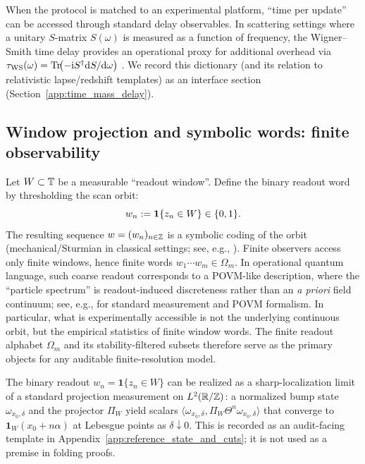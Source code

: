 \begin{remark}\label{rem:delay_time_dictionary}
When the protocol is matched to an experimental platform, ``time per update'' can be accessed through standard delay observables.
In scattering settings where a unitary $S$-matrix $S(\omega)$ is measured as a function of frequency, the Wigner--Smith time delay provides an operational proxy for additional overhead via $\tau_{\mathrm{WS}}(\omega)=\mathrm{Tr}\!\bigl(-\mathrm{i} S^\dagger \mathrm{d} S/\mathrm{d}\omega\bigr)$ \cite{Wigner1955,Smith1960}.
We record this dictionary (and its relation to relativistic lapse/redshift templates) as an interface section (Section~\ref{app:time_mass_delay}).
\end{remark}

\subsection{Window projection and symbolic words: finite observability}
\label{subsec:window_projection}

Let $W\subset\mathbb{T}$ be a measurable ``readout window''.
Define the binary readout word by thresholding the scan orbit:
\begin{equation}\label{eq:window_word}
w_n:=\mathbf{1}\{z_n\in W\}\in\{0,1\}.
\end{equation}
The resulting sequence $w=(w_n)_{n\in\mathbb{Z}}$ is a symbolic coding of the orbit (mechanical/Sturmian in classical settings; see, e.g., \cite{Lothaire2002,LindMarcus1995}).
Finite observers access only finite windows, hence finite words $w_1\cdots w_m\in\Omega_m$.
In operational quantum language, such coarse readout corresponds to a POVM-like description, where the ``particle spectrum'' is readout-induced discreteness rather than an \emph{a priori} field continuum; see, e.g., \cite{NielsenChuang2010} for standard measurement and POVM formalism.
In particular, what is experimentally accessible is not the underlying continuous orbit, but the empirical statistics of finite window words.
The finite readout alphabet $\Omega_m$ and its stability-filtered subsets therefore serve as the primary objects for any auditable finite-resolution model.

\begin{remark}\label{rem:window_words_projection_limit_pointer}
\AuditTag The binary readout $w_n=\mathbf{1}\{z_n\in W\}$ can be realized as a sharp-localization limit of a standard projection measurement on $L^2(\mathbb{R}/\mathbb{Z})$: a normalized bump state $\omega_{x_0,\delta}$ and the projector $\Pi_W$ yield scalars $\langle \omega_{x_0,\delta},\Pi_W\Theta^n\omega_{x_0,\delta}\rangle$ that converge to $\mathbf{1}_W(x_0+n\alpha)$ at Lebesgue points as $\delta\downarrow 0$.
This is recorded as an audit-facing template in Appendix~\ref{app:reference_state_and_cuts}; it is not used as a premise in folding proofs.
\end{remark}

